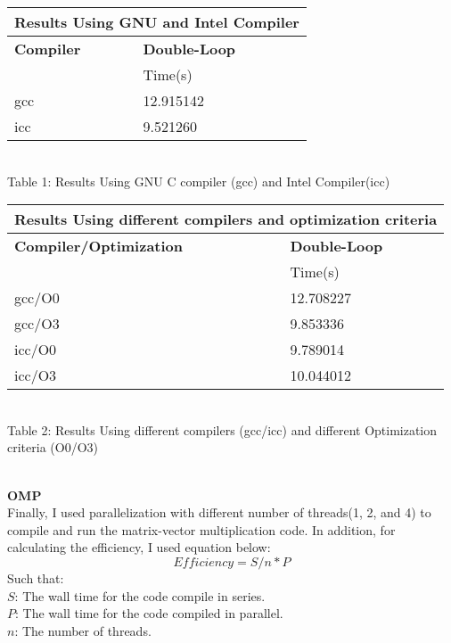 \documentclass[12pt]{article}
\begin{document}
{\centering
\begin{tabular}{ |p{3cm}||p{3cm}|  }
 \hline
 \multicolumn{2}{|c|}{Results Using GNU and Intel Compiler} \\
 \hline
 \textbf{Compiler} & \textbf{Double-Loop}\\
          & Time(s)\\
 \hline
 gcc   & 12.915142 \\
 icc &   9.521260 \\
 \hline
\end{tabular}\\
Table 1: Results Using GNU C compiler (gcc) and Intel Compiler(icc)\\}
\hfill \break
\hfill \break
\hfill \break
{\centering
\begin{tabular}{ |p{5cm}||p{3cm}| }
 \hline
 \multicolumn{2}{|c|}{Results Using different compilers and optimization criteria} \\
 \hline
 \textbf{Compiler/Optimization} & \textbf{Double-Loop}\\
          & Time(s)\\
 \hline
 gcc/O0 &   12.708227\\
 gcc/O3 &   9.853336 \\
 icc/O0 &   9.789014 \\
 icc/O3 &   10.044012 \\
 
 \hline
\end{tabular}\\
Table 2: Results Using different compilers (gcc/icc) and different Optimization criteria (O0/O3) \\
}
\hfill \break\\
\textbf{OMP}\\
Finally, I used parallelization with different number of threads(1, 2, and 4) to compile and run the matrix-vector multiplication code. In addition, for calculating the efficiency, I used equation below:
\begin{equation}
Efficiency=S/n*P
\end{equation}
Such that:\\
$S$: The wall time for the code compile in series.\\
$P$: The wall time for the code compiled in parallel.\\
$n$: The number of threads.\\
\end{document}
